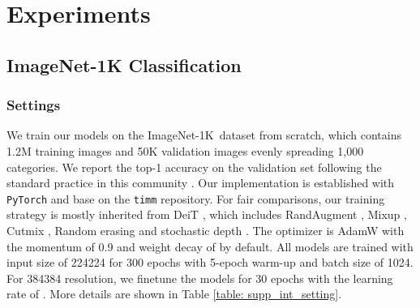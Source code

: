 \documentclass[letterpaper]{article} \usepackage{aaai23v}  \usepackage{times}  \usepackage{helvet}  \usepackage{courier}  \usepackage[hyphens]{url}  \usepackage{graphicx} \urlstyle{rm} \def\UrlFont{\rm}  \usepackage{caption} \frenchspacing  \setlength{\pdfpagewidth}{8.5in}  \setlength{\pdfpageheight}{11in}  \usepackage{algorithm}
\newcommand{\imntk}{ImageNet-1K}
\begin{document}
\section{Experiments}





\subsection{ImageNet-1K Classification}
\label{sec: int_cls}

\noindent
\subsubsection{Settings}
We train our models on the \imntk~dataset \cite{deng2009imagenet} from scratch, which contains 1.2M training images and 50K validation images evenly spreading 1,000 categories. We report the top-1 accuracy on the validation set following the standard practice in this community \cite{liu2021swin,liu2022convnext,wang2021pyramidpvt,chen2022cyclemlp}. Our implementation is established with \texttt{PyTorch} \cite{pytorch} and base on the \texttt{timm} \cite{rw2019timm} repository. For fair comparisons, our training strategy is mostly inherited from DeiT \cite{touvron2021deit}, which includes RandAugment \cite{cubuk2020randaugment}, Mixup \cite{zhang2017mixup}, Cutmix \cite{yun2019cutmix}, Random erasing \cite{zhong2020randomerasing} and stochastic depth \cite{huang2016deepdpr}. The optimizer is AdamW \cite{loshchilov2017decoupledadamw} with the momentum of 0.9 and weight decay of  by default. All models are trained with input size of 224224 for 300 epochs with 5-epoch warm-up and batch size of 1024. For 384384 resolution, we finetune the models for 30 epochs with the learning rate of . More details are shown in Table \ref{table: supp_int_setting}. 
\end{document}
